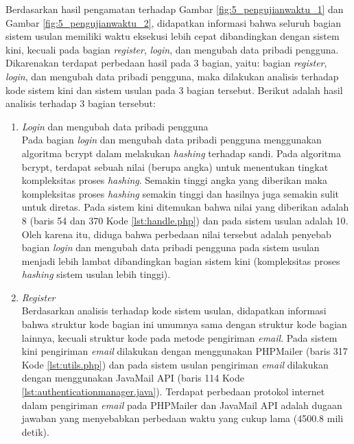 Berdasarkan hasil pengamatan terhadap Gambar \ref{fig:5_pengujianwaktu_1} dan Gambar \ref{fig:5_pengujianwaktu_2}, didapatkan informasi bahwa seluruh bagian sistem usulan memiliki waktu eksekusi lebih cepat dibandingkan dengan sistem kini, kecuali pada bagian \textit{register}, \textit{login}, dan mengubah data pribadi pengguna. Dikarenakan terdapat perbedaan hasil pada 3 bagian, yaitu: bagian \textit{register}, \textit{login}, dan mengubah data pribadi pengguna, maka dilakukan analisis terhadap kode sistem kini dan sistem usulan pada 3 bagian tersebut. Berikut adalah hasil analisis terhadap 3 bagian tersebut:
\begin{enumerate}
	\item \textit{Login} dan mengubah data pribadi pengguna\\
	Pada bagian \textit{login} dan mengubah data pribadi pengguna menggunakan algoritma bcrypt dalam melakukan \textit{hashing} terhadap sandi. Pada algoritma bcrypt, terdapat sebuah nilai (berupa angka) untuk menentukan tingkat kompleksitas proses \textit{hashing}\cite{jbcrypt}. Semakin tinggi angka yang diberikan maka kompleksitas proses \textit{hashing} semakin tinggi dan hasilnya juga semakin sulit untuk diretas. Pada sistem kini ditemukan bahwa nilai yang diberikan adalah 8 (baris 54 dan 370 Kode \ref{lst:handle.php}) dan pada sistem usulan adalah 10\cite{jbcrypt}. Oleh karena itu, diduga bahwa perbedaan nilai tersebut adalah penyebab bagian \textit{login} dan mengubah data pribadi pengguna pada sistem usulan menjadi lebih lambat dibandingkan bagian sistem kini (kompleksitas proses \textit{hashing} sistem usulan lebih tinggi).
	\item \textit{Register}\\
	Berdasarkan analisis terhadap kode sistem usulan, didapatkan informasi bahwa struktur kode bagian ini umumnya sama dengan struktur kode bagian lainnya, kecuali struktur kode pada metode pengiriman \textit{email}. Pada sistem kini pengiriman \textit{email} dilakukan dengan menggunakan PHPMailer (baris 317 Kode \ref{lst:utils.php}) dan pada sistem usulan pengiriman \textit{email} dilakukan dengan menggunakan JavaMail API (baris 114 Kode \ref{lst:authenticationmanager.java}). Terdapat perbedaan protokol internet dalam pengiriman \textit{email} pada PHPMailer dan JavaMail API adalah dugaan jawaban yang menyebabkan perbedaan waktu yang cukup lama (4500.8 mili detik). 
\end{enumerate}

